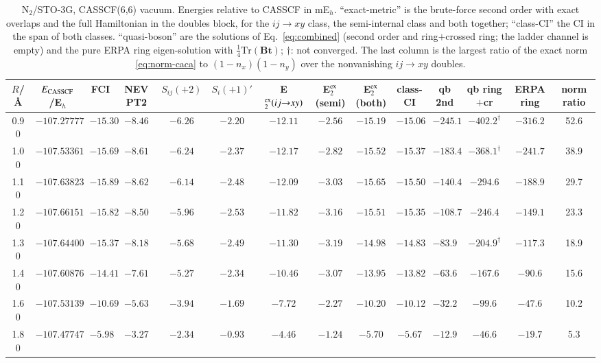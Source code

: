 \documentclass[aip,jcp,reprint,noshowkeys,superscriptaddress]{revtex4-1}
\newcommand{\bB}{\boldsymbol{B}}
\newcommand{\bt}{\boldsymbol{t}}
\begin{document}
\begin{table}[t]
\caption{N$_2$/STO-3G, CASSCF(6,6) vacuum.  Energies relative to CASSCF in
mE$_h$.  ``exact-metric'' is the brute-force second order with exact
overlaps and the full Hamiltonian in the doubles block, for the $ij\to xy$
class, the semi-internal class and both together; ``class-CI'' the CI in
the span of both classes.  ``quasi-boson'' are the solutions of
Eq.~\eqref{eq:combined} (second order and ring$+$crossed ring; the ladder
channel is empty) and the pure ERPA ring eigen-solution with
$\tfrac14\mathrm{Tr}(\bB\bt)$; $\dagger$: not converged.  The last column is
the largest ratio of the exact norm \eqref{eq:norm-caca} to
$(1-n_x)(1-n_y)$ over the nonvanishing $ij\to xy$ doubles.}
\label{tab:sto3g}
\small
\begin{ruledtabular}
\begin{tabular}{cccccccccccccc}
$R$/\AA & $E_{\rm CASSCF}$/E$_h$ & FCI & NEVPT2 & $S_{ij}(+2)$ & $S_i(+1)'$ & E$_2^{\rm ex}(ij{\to}xy)$ & E$_2^{\rm ex}$(semi) & E$_2^{\rm ex}$(both) & class-CI & qb 2nd & qb ring$+$cr & ERPA ring & norm ratio\\
\hline
0.90 & $-107.277771$ & $-15.30$ & $-8.46$ & $-6.26$ & $-2.20$ & $-12.11$ & $-2.56$ & $-15.19$ & $-15.06$ & $-245.1$ & $-402.2^\dagger$ & $-316.2$ & 52.6\\
1.00 & $-107.533612$ & $-15.69$ & $-8.61$ & $-6.24$ & $-2.37$ & $-12.17$ & $-2.82$ & $-15.52$ & $-15.37$ & $-183.4$ & $-368.1^\dagger$ & $-241.7$ & 38.9\\
1.10 & $-107.638233$ & $-15.89$ & $-8.62$ & $-6.14$ & $-2.48$ & $-12.09$ & $-3.03$ & $-15.65$ & $-15.50$ & $-140.4$ & $-294.6$ & $-188.9$ & 29.7\\
1.20 & $-107.661519$ & $-15.82$ & $-8.50$ & $-5.96$ & $-2.53$ & $-11.82$ & $-3.16$ & $-15.51$ & $-15.35$ & $-108.7$ & $-246.4$ & $-149.1$ & 23.3\\
1.30 & $-107.644001$ & $-15.37$ & $-8.18$ & $-5.68$ & $-2.49$ & $-11.30$ & $-3.19$ & $-14.98$ & $-14.83$ & $-83.9$ & $-204.9^\dagger$ & $-117.3$ & 18.9\\
1.40 & $-107.608767$ & $-14.41$ & $-7.61$ & $-5.27$ & $-2.34$ & $-10.46$ & $-3.07$ & $-13.95$ & $-13.82$ & $-63.6$ & $-167.6$ & $-90.6$ & 15.6\\
1.60 & $-107.531396$ & $-10.69$ & $-5.63$ & $-3.94$ & $-1.69$ & $-7.72$ & $-2.27$ & $-10.20$ & $-10.12$ & $-32.2$ & $-99.6$ & $-47.6$ & 10.2\\
1.80 & $-107.477475$ & $-5.98$ & $-3.27$ & $-2.34$ & $-0.93$ & $-4.46$ & $-1.24$ & $-5.70$ & $-5.67$ & $-12.9$ & $-46.6$ & $-19.7$ & 5.3\\

\end{tabular}
\end{ruledtabular}
\end{table}
\end{document}
